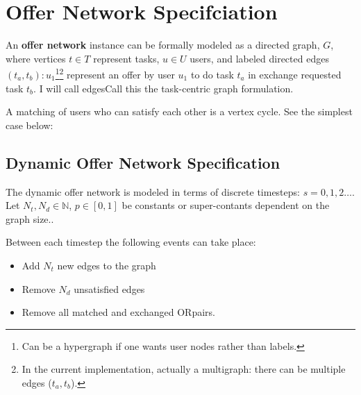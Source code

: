 \documentclass[main.tex]{subfiles}
\begin{document}
\section{Offer Network Specifciation}
An \textbf{offer network} instance can be formally modeled as a directed graph, $G$, where vertices $t \in T$ represent tasks, $u \in U$ users, and labeled directed edges $(t_a,t_b) : u_1$\footnote{Can be a hypergraph if one wants user nodes rather than labels.}\footnote{In the current implementation, actually a multigraph: there can be multiple edges ($t_a,t_b$).} represent an offer by user $u_1$ to do task $t_a$ in exchange requested task $t_b$. I will call edgesCall this the task-centric graph formulation.
\begin{center}
\end{center}

A matching of users who can satisfy each other is a vertex cycle. See the simplest case below:

\begin{center}
\end{center}

\subsection{Dynamic Offer Network Specification}
The dynamic offer network is modeled in terms of discrete timesteps: $s = 0, 1, 2 \dots$.
Let $N_t, N_d \in \mathbb{N}$, $p \in [0,1]$ be constants or super-contants dependent on the graph size..

Between each timestep the following events can take place:
\begin{itemize}
  \item Add $N_t$ new edges to the graph
  \item Remove $N_d$ unsatisfied edges
  \item Remove all matched and exchanged ORpairs.
\end{itemize}
\end{document}
